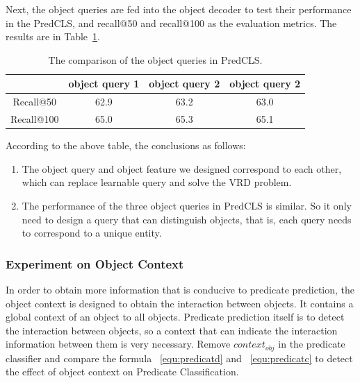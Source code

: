 Next, the object queries are fed into the object decoder to test their performance in the PredCLS, and recall@50 and recall@100 as the evaluation metrics. The results are in Table~\ref{tab:result_object _query}.

\begin{table}[!h]
	\centering
	\begin{tabular}{c|ccc}
		\hline
		& object query 1 & object query 2 & object query 2 \\ \hline
		Recall@50  & 62.9            & 63.2            & 63.0              \\
		Recall@100 & 65.0             & 65.3              & 65.1              \\ \hline
	\end{tabular}

\caption[The comparison of the object queries in PredCLS]{The comparison of the object queries in PredCLS.}
\label{tab:result_object _query}
\end{table}

According to the above table,  the conclusions as follows:

\begin{enumerate}
	\item The object query and object feature we designed correspond to each other, which can replace learnable query and solve the VRD problem.
	\item The performance of the three object queries in PredCLS is similar. So it only need to design a query that can distinguish objects, that is, each query needs to correspond to a unique entity. 
\end{enumerate}

\subsubsection{Experiment on Object Context}
In order to obtain more information that is conducive to predicate prediction, the object context is designed to obtain the interaction between objects. It contains a global context of an object to all objects. Predicate prediction itself is to detect the interaction between objects, so a context that can indicate the interaction information between them is very necessary. Remove $ context_{obj }$ in the predicate classifier and compare the formula ~\ref{equ:predicatd}  and ~\ref{equ:predicatc} to detect the effect of object context on Predicate Classification.

